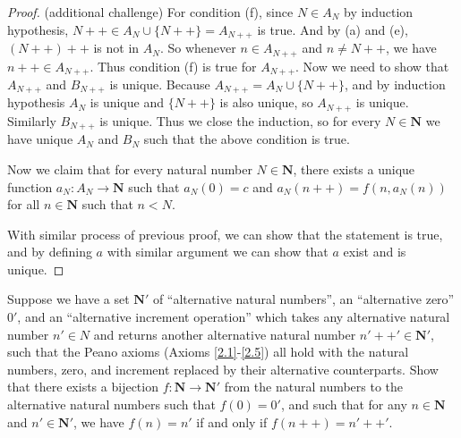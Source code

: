 \begin{proof}{(additional challenge)}
For condition (f), since \(N \in A_N\) by induction hypothesis, \(N++ \in A_N \cup \{N++\} = A_{N++}\) is true.
And by (a) and (e), \((N++)++\) is not in \(A_N\).
So whenever \(n \in A_{N++}\) and \(n \neq N++\), we have \(n++ \in A_{N++}\).
Thus condition (f) is true for \(A_{N++}\).
Now we need to show that \(A_{N++}\) and \(B_{N++}\) is unique.
Because \(A_{N++} = A_N \cup \{N++\}\), and by induction hypothesis \(A_N\) is unique and \(\{N++\}\) is also unique, so \(A_{N++}\) is unique.
Similarly \(B_{N++}\) is unique.
Thus we close the induction, so for every \(N \in \mathbf{N}\) we have unique \(A_N\) and \(B_N\) such that the above condition is true.

Now we claim that for every natural number \(N \in \mathbf{N}\), there exists a unique function \(a_N : A_N \to \mathbf{N}\) such that \(a_N(0) = c\) and \(a_N(n++) = f(n, a_{N}(n))\) for all \(n \in \mathbf{N}\) such that \(n < N\).

With similar process of previous proof, we can show that the statement is true, and by defining \(a\) with similar argument we can show that \(a\) exist and is unique.
\end{proof}

\begin{exercise}\label{ex 3.5.13}
Suppose we have a set \(\mathbf{N}'\) of ``alternative natural numbers'', an ``alternative zero'' \(0'\), and an ``alternative increment operation'' which takes any alternative natural number \(n' \in N\) and returns another alternative natural number \(n'++' \in \mathbf{N}'\), such that the Peano axioms (Axioms \ref{2.1}-\ref{2.5}) all hold with the natural numbers, zero, and increment replaced by their alternative counterparts.
Show that there exists a bijection \(f : \mathbf{N} \to \mathbf{N}'\) from the natural numbers to the alternative natural numbers such that \(f(0) = 0'\), and such that for any \(n \in \mathbf{N}\) and \(n' \in \mathbf{N}'\), we have \(f(n) = n'\) if and only if \(f(n++) = n'++'\).
\end{exercise}

